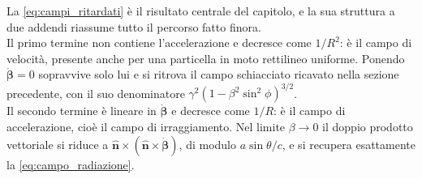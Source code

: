 La \eqref{eq:campi_ritardati} è il risultato centrale del capitolo, e la sua struttura a due addendi riassume tutto il percorso fatto finora.\\
Il primo termine non contiene l'accelerazione e decresce come $1/R^2$: è il campo di velocità, presente anche per una particella in moto rettilineo uniforme. Ponendo $\dot{\boldsymbol{\beta}} = 0$ sopravvive solo lui e si ritrova il campo schiacciato ricavato nella sezione precedente, con il suo denominatore $\gamma^2(1-\beta^2\sin^2\phi)^{3/2}$.\\
Il secondo termine è lineare in $\dot{\boldsymbol{\beta}}$ e decresce come $1/R$: è il campo di accelerazione, cioè il campo di irraggiamento. Nel limite $\beta \to 0$ il doppio prodotto vettoriale si riduce a $\hat{\mathbf{n}}\times(\hat{\mathbf{n}}\times\dot{\boldsymbol{\beta}})$, di modulo $a\sin\theta/c$, e si recupera esattamente la \eqref{eq:campo_radiazione}.